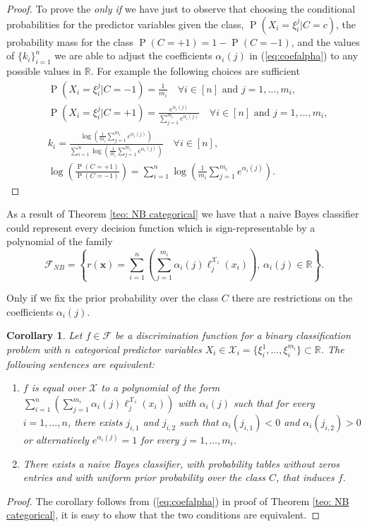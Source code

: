 \documentclass[11pt,a4paper, twoside]{book}
\newtheorem{corollary}{Corollary}[chapter]
\newcommand{\Pp}{\operatorname{P}}
\newcommand{\bchi}{\boldsymbol{\mathcal{X}}}
\newcommand{\nchi}{\mathcal{X}}
\begin{document}
\begin{proof}
To prove the \textit{only if} we have just to observe that choosing the conditional probabilities for the predictor variables given the class, $\Pp(X_i=\xi_i^j|C=c)$, the probability mass for the class $\Pp(C=+1)=1-\Pp(C=-1)$, and the values of $\{k_i\}_{i=1}^n$ we are able to adjust the coefficients $\alpha_i(j)$ in (\ref{eq:coefalpha}) to any possible values in $\mathbb{R}$.
For example the following choices are sufficient
\begin{align*}
&\Pp(X_i=\xi_i^j|C=-1)=\frac{1}{m_i}\quad \forall i \in [n] \text{ and } j=1,\ldots,m_i ,\\
&\Pp(X_i=\xi_i^j|C=+1)=\frac{e^{\alpha_i(j)}}{\sum_{j=1}^{m_i}e^{\alpha_i(j)}} \quad \forall i \in [n] \text{ and } j=1,\ldots,m_i,\\
&k_i= \frac{\log\left( \frac{1}{m_i}\sum_{j=1}^{m_i}e^{\alpha_i(j)} \right)}{\sum_{i=1}^n \log\left(\frac{1}{m_i} \sum_{j=1}^{m_i}e^{\alpha_i(j)}\right)} \quad \forall i \in [n] ,\\
&\log\left( \frac{\Pp(C=+1)}{\Pp(C=-1)} \right)=\sum_{i=1}^n \log\left( \frac{1}{m_i}\sum_{j=1}^{m_i}e^{\alpha_i(j)} \right).  
\end{align*} 
\end{proof}

As a result of Theorem \ref{teo: NB categorical} we have that a naive Bayes classifier could represent every decision function which is sign-representable by a polynomial of the family 
\[ \mathcal{F}_{NB}=\left\{ r(\mathbf{x})=\sum_{i=1}^n \left( \sum_{j=1}^{m_i}  \alpha_{i}(j)\ell ^{\nchi_i} _j(x_i) \right)\text{, } \alpha_{i}(j) \in \mathbb{R}  \right\} . \]


Only if we fix the prior probability over the class $C$ there are restrictions on the coefficients $\alpha_{i}(j)$. 

\begin{corollary}
Let $f \in \mathcal{F}$ be a discrimination function for a binary classification problem with $n$ categorical predictor variables $X_i \in \nchi_i=\{\xi_i^1,\ldots,\xi_i^{m_i}\}\subset \mathbb{R}$. The following sentences are equivalent:
\begin{enumerate}
\item[i)] $f$ is equal over $\bchi$ to a polynomial of the form $\sum_{i=1}^n \left( \sum_{j=1}^{m_i}  \alpha_{i}(j)\ell ^{\nchi_i} _j(x_i) \right)$ with $\alpha_{i}(j)$ such that for every $i=1,\ldots,n$, there exists $j_{i,1}$ and $j_{i,2}$ such that ${\alpha_{i}(j_{i,1})}<0$ and ${\alpha_{i}(j_{i,2})}>0$ or alternatively $e^{\alpha_{i}(j)}=1$ for every $j=1,\ldots,m_i$.   
\item[ii)] There exists a naive Bayes classifier, {with probability tables without zeros entries} and with uniform prior probability over the class $C$, that induces $f$.
\end{enumerate}
\label{cor: NB categorical prior}
\end{corollary}
\begin{proof}
The corollary follows from (\ref{eq:coefalpha}) in proof of Theorem \ref{teo: NB categorical}, it is easy to show that the two conditions are equivalent.
\end{proof}
\end{document}
